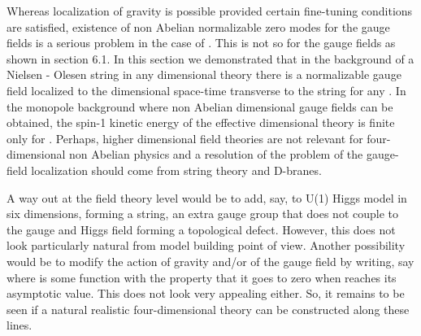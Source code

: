 \documentclass[a4paper,12pt]{article}
\begin{document}
Whereas localization of gravity is possible provided certain
fine-tuning conditions are satisfied, existence of non Abelian
normalizable zero modes for the gauge fields is a serious problem
in the case of \coordHE{}. This is not so for the \coordHE{} gauge
fields as shown in section 6.1. In this section we demonstrated
that in the background of a Nielsen - Olesen string in any \coordHE{}
dimensional theory there is a normalizable \coordHE{} gauge field
localized to the \coordHE{} dimensional space-time transverse to the
string for any \coordHE{}.
 In the monopole background where  non Abelian \coordHE{}
dimensional gauge fields can be obtained, the spin-1 kinetic
energy of the effective \coordHE{} dimensional theory is finite only
for \coordHE{}. Perhaps, higher dimensional field theories are not
 relevant for four-dimensional non Abelian physics and a
resolution of the problem of the gauge-field localization should
come from string theory and D-branes.

A way out at the field theory level would be to add, say, to U(1)
Higgs model in six dimensions, forming a string, an extra gauge
group that does not couple to the gauge and Higgs field forming a
topological defect. However, this does not look particularly
natural from model building point of view. Another possibility
would be to modify the action of gravity and/or of the gauge field
by writing, say \coordHE{} where \coordHE{} is some function with
the property that it goes to zero when \myHighlight{$\Phi$}\coordHE{} reaches its
asymptotic value. This does not look very appealing either. So, it
remains to be seen if a natural realistic four-dimensional theory
can be constructed along these lines.
\end{document}
